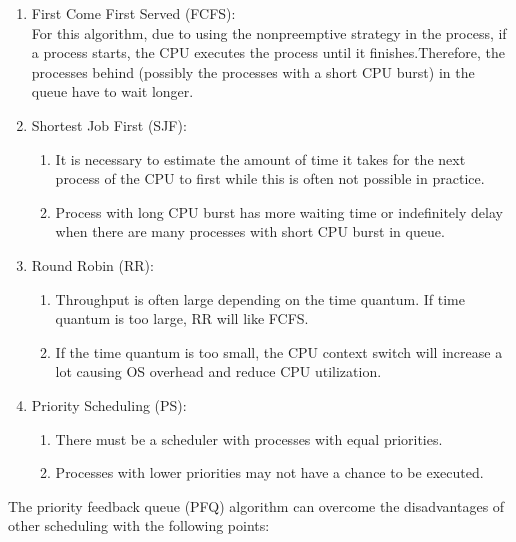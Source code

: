 \documentclass[13pt,a4paper]{article}
\begin{document}
			\begin{enumerate}[-]
				\item First Come First Served (FCFS):\\
					For this algorithm, due to using the nonpreemptive strategy in the process, if a process starts, the CPU executes the process until it finishes.Therefore, the processes behind (possibly the processes with a short CPU burst) in the queue have to wait longer.
				\item Shortest Job First (SJF):
					\begin{enumerate}[+]
						\item It is necessary to estimate the amount of time it takes for the next process of the CPU to first while this is often not possible in practice.
						\item Process with long CPU burst has more waiting time or indefinitely delay when there are many processes with short CPU burst in queue.
					\end{enumerate}
				\item Round Robin (RR):
					\begin{enumerate}[+]
						\item Throughput is often large depending on the time quantum. If time quantum is too large, RR will like FCFS.
						\item If the time quantum is too small, the CPU context switch will increase a lot causing OS overhead and reduce CPU utilization.
					\end{enumerate}
				\item Priority Scheduling (PS):
					\begin{enumerate}[+]
						\item There must be a scheduler with processes with equal priorities.
						\item Processes with lower priorities may not have a chance to be executed.
					\end{enumerate}
			\end{enumerate}
			The priority feedback queue (PFQ) algorithm can overcome the disadvantages of other scheduling with the following points:\\
\end{document}

